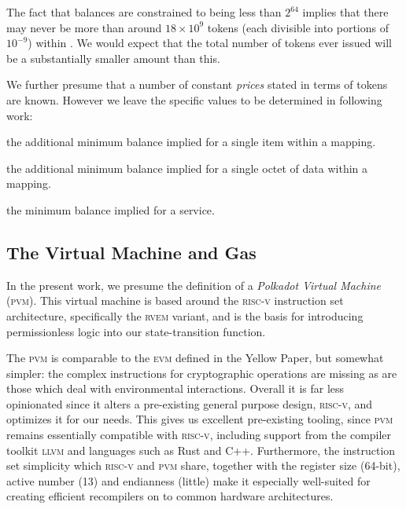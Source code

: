 The fact that balances are constrained to being less than $2^{64}$ implies that there may never be more than around $18\times10^{9}$ tokens (each divisible into portions of $10^{-9}$) within \Jam. We would expect that the total number of tokens ever issued will be a substantially smaller amount than this.

We further presume that a number of constant \emph{prices} stated in terms of tokens are known. However we leave the specific values to be determined in following work:

\begin{description}\label{eq:prices}
  \item[$\Citemdeposit$] the additional minimum balance implied for a single item within a mapping.
  \item[$\Cbytedeposit$] the additional minimum balance implied for a single octet of data within a mapping.
  \item[$\Cbasedeposit$] the minimum balance implied for a service.
\end{description}




















\subsection{The Virtual Machine and Gas}\label{sec:virtualmachineandgas}

In the present work, we presume the definition of a \emph{Polkadot Virtual Machine} (\textsc{pvm}). This virtual machine is based around the \textsc{risc-v} instruction set architecture, specifically the \textsc{rv}\textsc{em} variant, and is the basis for introducing permissionless logic into our state-transition function.

The \textsc{pvm} is comparable to the \textsc{evm} defined in the Yellow Paper, but somewhat simpler: the complex instructions for cryptographic operations are missing as are those which deal with environmental interactions. Overall it is far less opinionated since it alters a pre-existing general purpose design, \textsc{risc-v}, and optimizes it for our needs. This gives us excellent pre-existing tooling, since \textsc{pvm} remains essentially compatible with \textsc{risc-v}, including support from the compiler toolkit \textsc{llvm} and languages such as Rust and C++. Furthermore, the instruction set simplicity which \textsc{risc-v} and \textsc{pvm} share, together with the register size (64-bit), active number (13) and endianness (little) make it especially well-suited for creating efficient recompilers on to common hardware architectures.

